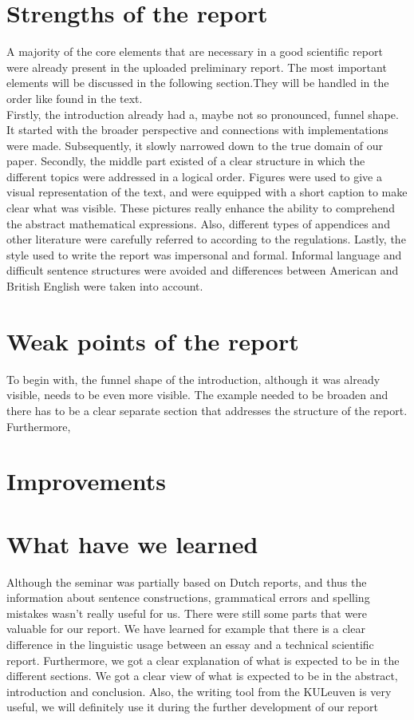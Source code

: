\documentclass{article}
\begin{document}

\section{Strengths of the report}
A majority of the core elements that are necessary in a good scientific report were already present in the uploaded preliminary report. The most important elements will be discussed in the following section.They will be handled in the order like found in the text.\\
Firstly, the introduction already had a, maybe not so pronounced, funnel shape. It started with the broader perspective and connections with implementations were made. Subsequently, it slowly narrowed down to the true domain of our paper.
Secondly, the middle part existed of a clear structure in which the different topics were addressed in a logical order. Figures were used to give a visual representation of the text, and were equipped with a short caption to make clear what was visible. These pictures really enhance the ability to comprehend the abstract mathematical expressions. Also, different types of appendices and other literature were carefully referred to according to the regulations.
Lastly, the style used to write the report was impersonal and formal. Informal language and difficult sentence structures were avoided and differences between American and British English were taken into account. 

\section{Weak points of the report}

To begin with, the funnel shape of the introduction, although it was already visible, needs to be even more visible. The example needed to be broaden and there has to be a clear separate section that addresses the structure of the report.
\\
Furthermore, 

\section{Improvements}


\section{What have we learned}


Although the seminar was partially based on Dutch reports, and thus the information about sentence constructions, grammatical errors and spelling mistakes wasn't really useful for us. There were still some parts that were valuable for our report. We have learned for example 
that there is a clear difference in the linguistic usage between an essay and a technical scientific report. Furthermore, we got a clear explanation of what is expected to be in the different sections. We got a clear view of what is expected to be in the abstract, introduction and conclusion. Also, the writing tool from the KULeuven is very useful, we will definitely use it during the further development of our report
\end{document}
